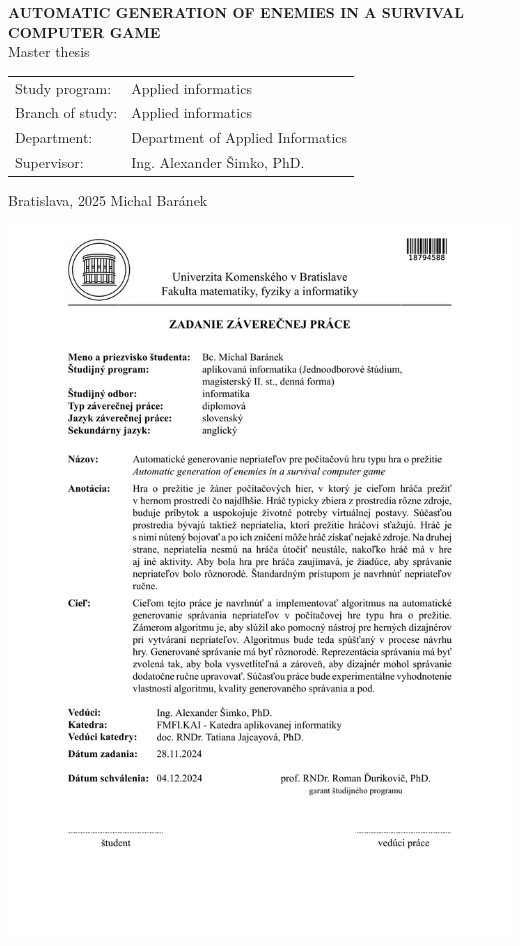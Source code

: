 \documentclass[12pt, twoside, openany]{book}
\def\mftitle{Automatic generation of enemies in a survival computer game}
\def\mfthesistype{Master thesis}
\def\mfauthor{Michal Baránek}
\def\mfsupervisor{Ing. Alexander Šimko, PhD.}
\def\mfplacedate{Bratislava, 2025}
\def\mfbranch{Applied informatics}
\def\program{Applied informatics}
\def\mfdepartment{Department of Applied Informatics}
\begin{document}
	\begin{center}
		\textbf{\MakeUppercase{\Large\mftitle}}\\
		\mfthesistype
	\end{center}
	\vfill
	
	
	\begin{tabular}{l l}
		Study program: & \program \\
		Branch of study: & \mfbranch \\
		Department: & \mfdepartment \\
		Supervisor: & \mfsupervisor \\
	\end{tabular}
	
	\vfill
	\noindent
	\mfplacedate \hfill
	\mfauthor
	\cleardoublepage
	
	
	
	
	\newpage 
	\thispagestyle{empty}
	\hspace{-2cm}\includegraphics[page=1,width=1.1\textwidth]{zadanie.pdf}
	
\end{document}
